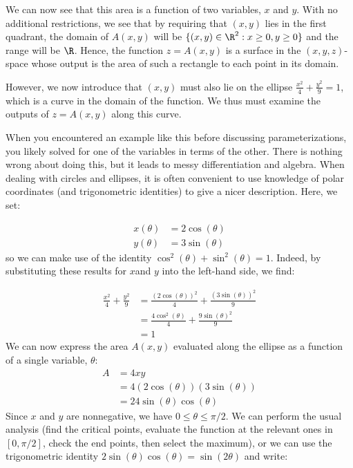 \documentclass{ximera}
\begin{document}
\begin{example}
We can now see that this area is a function of two variables, $x$ and $y$.  With no additional restrictions, we see that by requiring that $(x,y)$ lies in the first quadrant, the domain of $A(x,y)$ will be $\{ (x,y) \in \R^2 : x \geq 0, y \geq 0 \}$ and the range will be $\R$.  Hence, the function $z = A(x,y)$ is a surface in the $(x,y,z)$-space whose output is the area of such a rectangle to each point in its domain. 

However, we now introduce that $(x,y)$ must also lie on the ellipse $\frac{x^2}{4}+\frac{y^2}{9} =1$, which is a curve in the domain of the function.  We thus must examine the outputs of $z=A(x,y)$ along this curve.  

When you encountered an example like this before discussing parameterizations, you likely solved for one of the variables in terms of the other.  There is nothing wrong about doing this, but it leads to messy differentiation and algebra.  When dealing with circles and ellipses, it is often convenient to use knowledge of polar coordinates (and trigonometric identities) to give a nicer description.  Here, we set:

\begin{align*}
x(\theta) &= 2 \cos(\theta) \\
y(\theta) &= 3 \sin(\theta)
\end{align*}
so we can make use of the identity $\cos^2(\theta) + \sin^2(\theta) =1$.  Indeed, by substituting these results for $x$and $y$ into the left-hand side, we find:

\begin{align*}
  \frac{x^2}{4}+\frac{y^2}{9} &=\frac{(2 \cos(\theta))^2}{4}+\frac{(3 \sin(\theta))^2}{9}\\
  &=\frac{4 \cos^2(\theta)}{4}+\frac{9 \sin(\theta)^2}{9}\\
  &=1
\end{align*}
We can now express the area $A(x,y)$ evaluated along the ellipse as a
function of a single variable, $\theta$:
\begin{align*}
  A &= 4xy \\
  &= 4(2 \cos(\theta) )(3 \sin(\theta) ) \\
  &= 24 \sin(\theta)\cos(\theta)
\end{align*}
Since $x$ and $y$ are nonnegative, we have $0\le \theta \le \pi/2$.  We can perform the usual analysis (find the critical points, evaluate the function at the relevant ones in $[0,\pi/2]$, check the end points, then select the maximum), or we can use the trigonometric identity $2\sin(\theta)\cos(\theta) = \sin(2\theta)$ and write:


\end{example}
\end{document}
